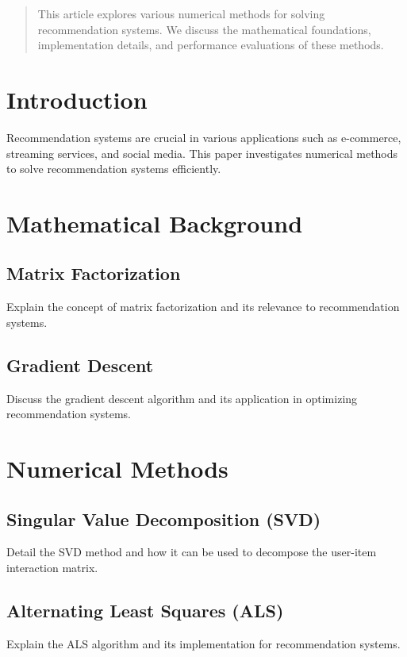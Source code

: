 \documentclass[12pt]{article}
\begin{document}

\begin{abstract}
  This article explores various numerical methods for solving recommendation systems. We discuss the mathematical foundations, implementation details, and performance evaluations of these methods.
\end{abstract}

\section{Introduction}
Recommendation systems are crucial in various applications such as e-commerce, streaming services, and social media. This paper investigates numerical methods to solve recommendation systems efficiently.

\section{Mathematical Background}
\subsection{Matrix Factorization}
Explain the concept of matrix factorization and its relevance to recommendation systems.

\subsection{Gradient Descent}
Discuss the gradient descent algorithm and its application in optimizing recommendation systems.

\section{Numerical Methods}
\subsection{Singular Value Decomposition (SVD)}
Detail the SVD method and how it can be used to decompose the user-item interaction matrix.

\subsection{Alternating Least Squares (ALS)}
Explain the ALS algorithm and its implementation for recommendation systems.
\end{document}
